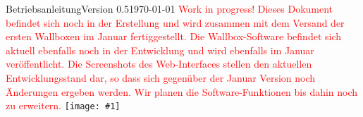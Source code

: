 \documentclass[a4paper,10pt]{article}
\title{}
\author{}
\newcommand{\gfx}[1]{\texttt{[image: \#1]}}
\begin{document}
\begin{titlepage}
	Betriebsanleitung\hfill Version 0.5\hfill \today \centering \vfill
	\colorbox{boxgray}{} \vfill \textcolor{red}{Work in progress!} \vfill
	\textcolor{red}{Dieses Dokument befindet sich noch in der Erstellung und wird zusammen mit dem
		Versand der ersten Wallboxen im Januar fertiggestellt. Die Wallbox-Software
		befindet sich aktuell ebenfalls noch in der Entwicklung und wird ebenfalls im
		Januar veröffentlicht. Die Screenshots des Web-Interfaces stellen den aktuellen
		Entwicklungsstand dar, so dass sich gegenüber der Januar Version noch Änderungen ergeben werden. Wir
		planen die Software-Funktionen bis dahin noch zu erweitern.} \vfill \gfx{./img/resized/warp_perspective_blue_ready}
\end{titlepage}
\end{document}
